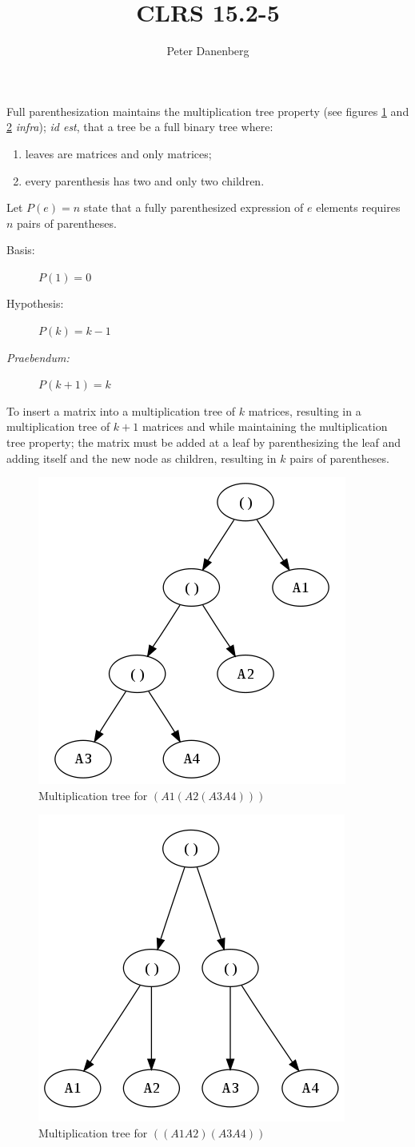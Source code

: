 \documentclass{article}
\title{CLRS 15.2-5}
\author{Peter Danenberg}
\begin{document}
\maketitle

Full parenthesization maintains the multiplication tree property (see
figures \ref{fig:backbone} and \ref{fig:stacked} \emph{infra});
\emph{id est}, that a tree be a full binary tree where:

\begin{enumerate}
\item leaves are matrices and only matrices;
\item every parenthesis has two and only two children.
\end{enumerate}

Let $P(e) = n$ state that a fully parenthesized expression of $e$
elements requires $n$ pairs of parentheses.

\begin{description}
  \item[Basis:] $P(1) = 0$
  \item[Hypothesis:] $P(k) = k-1$
  \item[\emph{Praebendum:}] $P(k + 1) = k$
\end{description}

To insert a matrix into a multiplication tree of $k$ matrices,
resulting in a multiplication tree of $k+1$ matrices and while
maintaining the multiplication tree property; the matrix must be added
at a leaf by parenthesizing the leaf and adding itself and the new
node as children, resulting in $k$ pairs of parentheses.

\begin{figure}[ht]
  \centering
  \includegraphics[width=0.5\linewidth]{15.2-5-backbone}
  \caption{Multiplication tree for $(A1 (A2 (A3 A4)))$}
  \label{fig:backbone}
\end{figure}

\begin{figure}[ht]
  \centering
  \includegraphics[width=0.5\linewidth]{15.2-5-stacked}
  \caption{Multiplication tree for $((A1 A2)(A3 A4))$}
  \label{fig:stacked}
\end{figure}
\end{document}

